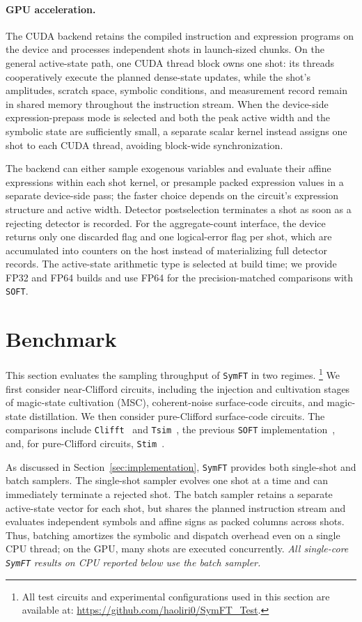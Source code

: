 \documentclass[a4paper,onecolumn,unpublished]{quantumarticle}
\newcommand{\tFont}[1]{\texttt{#1}}
\newcommand{\symft}{\tFont{SymFT}}
\newcommand{\soft}{\tFont{SOFT}}
\newcommand{\stim}{\tFont{Stim}}
\newcommand{\tsim}{\tFont{Tsim}}
\newcommand{\clifft}{\tFont{Clifft}}
\begin{document}
\paragraph{GPU acceleration.}
The CUDA backend retains the compiled instruction and expression
programs on the device and processes independent shots in launch-sized chunks. On the general active-state path, one CUDA thread block owns one shot: its threads cooperatively execute the planned dense-state updates, while the shot's amplitudes, scratch space, symbolic conditions, and measurement record remain in shared memory throughout the instruction stream. When the device-side expression-prepass mode is selected and both the peak active width and the symbolic state are sufficiently small, a separate scalar kernel instead assigns one shot to each CUDA thread, avoiding block-wide synchronization.

The backend can either sample exogenous variables and evaluate their affine expressions within each shot kernel, or presample packed expression values in a separate device-side pass; the faster choice depends on the circuit's expression structure and active width. Detector postselection terminates a shot as soon as a rejecting detector is recorded.
For the aggregate-count interface, the device returns only one discarded flag and one logical-error flag per shot, which are accumulated into counters on the host instead of materializing full detector records.
The active-state arithmetic type is selected at build time; we provide FP32 and FP64 builds and use FP64 for the precision-matched comparisons with \soft{}.

\section{Benchmark}
\label{sec:benchmark}

This section evaluates the sampling throughput of \symft{} in two regimes. \footnote{All test circuits and experimental configurations used in this section are available at: \url{https://github.com/haoliri0/SymFT_Test}.}
We first consider near-Clifford circuits, including the injection and cultivation stages of magic-state cultivation (MSC), coherent-noise surface-code circuits, and magic-state distillation.
We then consider pure-Clifford surface-code circuits.
The comparisons include \clifft{}~{\cite{CL26}} and \tsim{}~\cite{HLZ26}, the previous \soft{} implementation~\cite{LZZ+25}, and, for pure-Clifford circuits, \stim{}~\cite{Gidney21}.

As discussed in Section~\ref{sec:implementation}, \symft{} provides both single-shot and batch samplers.
The single-shot sampler evolves one shot at a time and can immediately terminate a rejected shot.
The batch sampler retains a separate active-state vector for each shot, but shares the planned instruction stream and evaluates independent symbols and affine signs as packed columns across shots.
Thus, batching amortizes the symbolic and dispatch overhead even on a single CPU thread; on the GPU, many shots are executed concurrently.
\emph{All single-core \symft{} results on CPU reported below use the batch sampler.}
\end{document}
